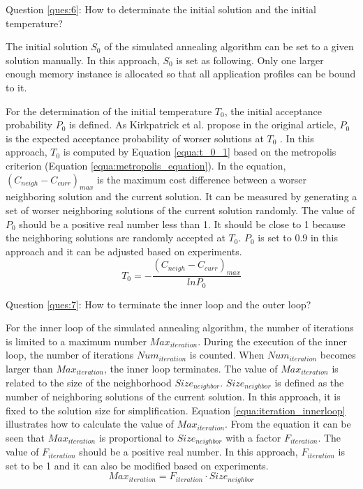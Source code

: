 		Question \ref{ques:6}: How to determinate the initial solution and the
		initial temperature?
		
		The initial solution $S_{0}$ of the simulated annealing algorithm can be set
		to a given solution manually.
		In this approach, $S_{0}$ is set as following.
		Only one larger enough memory instance is allocated so that all application
		profiles can be bound to it.
		
		For the determination of the initial temperature $T_{0}$, the initial acceptance
		probability $P_{0}$ is defined.
		As Kirkpatrick et al. propose in the original article,
		$P_{0}$ is the expected acceptance probability of worser solutions at $T_{0}$
		\cite{10.2307/1690046}.
		In this approach, $T_{0}$ is computed by Equation \ref{equa:t_0_1} based
		on the metropolis criterion (Equation \ref{equa:metropolis_equation}).
		In the equation, $\left( C_{neigh}-C_{curr} \right)_{max}$
		is the maximum cost difference between a worser neighboring solution and the current
		solution.
		It can be measured by generating a set of worser neighboring solutions of the
		current solution randomly.
		The value of $P_{0}$ should be a positive real number less than 1.
		It should be close to 1 because the neighboring solutions are randomly
		accepted at $T_{0}$.
		$P_{0}$ is set to 0.9 in this approach and it can be adjusted based on experiments.
		\begin{equation}
		\label{equa:t_0_1}
			T_{0}= - \frac{\left( C_{neigh}-C_{curr} \right)_{max} }{ln{P_{0}}}
		\end{equation}
		
		Question \ref{ques:7}: How to terminate the inner loop and the outer loop?
		
		For the inner loop of the simulated annealing algorithm, the
		number of iterations is limited to a maximum number $Max_{iteration}$.
		During the execution of the inner loop, the number of iterations
		$Num_{iteration}$ is counted.
		When $Num_{iteration}$ becomes larger than $Max_{iteration}$, the inner
		loop terminates.
		The value of $Max_{iteration}$ is related to the size of the
		neighborhood $Size_{neighbor}$. $Size_{neighbor}$ is defined as the number
		of neighboring solutions of the current solution.
		In this approach, it is fixed to the solution size for simplification.
		Equation \ref{equa:iteration_innerloop} illustrates how to calculate the
		value of $Max_{iteration}$.
		From the equation it can be seen that $Max_{iteration}$ is proportional
		to $Size_{neighbor}$ with a factor $F_{iteration}$.
		The value of $F_{iteration}$ should be a positive real number.
		In this approach, $F_{iteration}$ is set to be 1 and it can also be
		modified based on experiments.
		\begin{equation}
		\label{equa:iteration_innerloop}
			Max_{iteration}=F_{iteration} \cdot Size_{neighbor}
		\end{equation}
		
